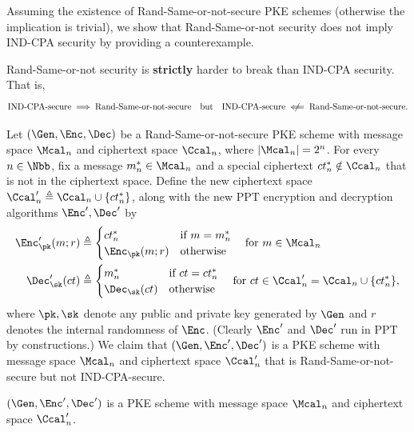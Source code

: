 \begin{answer}[iv]
    Assuming the existence of Rand-Same-or-not-secure PKE schemes (otherwise the implication is trivial), we show that Rand-Same-or-not security does not imply IND-CPA security by providing a counterexample.
    \begin{note}
        Rand-Same-or-not security is \textbf{strictly} harder to break than IND-CPA security. That is,
        \[
            \textrm{IND-CPA-secure}\implies \textrm{Rand-Same-or-not-secure} \quad\textrm{but}\quad
            \textrm{IND-CPA-secure}\centernot\impliedby \textrm{Rand-Same-or-not-secure}.
        \]
    \end{note}

    Let $(\Gen, \Enc, \Dec)$ be a  Rand-Same-or-not-secure PKE scheme with message space $\Mcal_n$ and ciphertext space $\Ccal_n$, where $|\Mcal_n|=2^n$. For every $n\in\Nbb$, fix a message $m^\ast_n\in\Mcal_n$ and a special ciphertext ${ct}^\ast_n\notin\Ccal_n$ that is not in the ciphertext space. Define the new ciphertext space  $\Ccal'_n\triangleq \Ccal_n \cup \{{ct}^\ast_n\}$, along with the new PPT encryption and decryption algorithms $\Enc', \Dec'$ by
    \begin{align*}
        \Enc'_\pk (m; r) &\triangleq \begin{cases}
            {ct}^\ast_n & \textrm{if } m = m^\ast_n\\
            \Enc_\pk (m; r) & \textrm{otherwise}\
        \end{cases}
        \quad \textrm{for } m\in\Mcal_n\\
        \Dec'_\sk(ct) &\triangleq \begin{cases}
            m^\ast_n & \textrm{if } ct = {ct}^\ast_n\\
            \Dec_\sk (ct) & \textrm{otherwise}\
        \end{cases}
        \quad \textrm{for } ct\in\Ccal_n'=\Ccal_n\cup \{{ct}^\ast_n\},
    \end{align*}
    where $\pk,\sk$ denote any public and private key generated by $\Gen$ and $r$ denotes the internal randomness of $\Enc$. (Clearly $\Enc'$ and $\Dec'$ run in PPT by constructions.)
    We claim that  $(\Gen, \Enc', \Dec')$ is a PKE scheme with message space $\Mcal_n$ and ciphertext space $\Ccal'_n$ that is Rand-Same-or-not-secure but not IND-CPA-secure.
    \begin{claim}
         $(\Gen, \Enc', \Dec')$ is a PKE scheme with message space $\Mcal_n$ and ciphertext space $\Ccal'_n$.
    \end{claim}

\end{answer}

